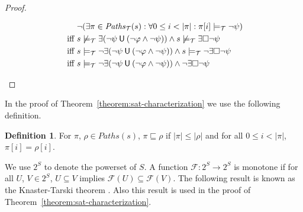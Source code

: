 \documentclass[12pt]{article}
\newcommand{\always}{\Box}
\newcommand{\until}{\mathbin{\sf U}}
\theoremstyle{definition}
\newtheorem{definition}{Definition}
\begin{document}
\begin{proof}
\begin{itemize}
\begin{align*}
& \neg (\exists \pi \in \mathit{Paths}_{\mathcal{T}}(s) : \forall 0 \leq i < |\pi| : \pi[i] \models_{\mathcal{T}} \neg \psi)\\
\mbox{ iff } & s \not\models_{\mathcal{T}} \exists (\neg \psi \until (\neg \varphi \wedge \neg \psi)) \wedge s \not\models_{\mathcal{T}} \exists \always \neg \psi\\
\mbox{ iff } & s \models_{\mathcal{T}} \neg \exists (\neg \psi \until (\neg \varphi \wedge \neg \psi)) \wedge s \models_{\mathcal{T}} \neg \exists \always \neg \psi\\
\mbox{ iff } & s \models_{\mathcal{T}} \neg \exists (\neg \psi \until (\neg \varphi \wedge \neg \psi)) \wedge \neg \exists \always \neg \psi
\end{align*}
\end{itemize}
\end{proof}

In the proof of Theorem~\ref{theorem:sat-characterization} we use the following definition.

\begin{definition}
For $\pi$, $\rho \in \mathit{Paths}(s)$, $\pi \sqsubseteq \rho$ if  $|\pi| \leq |\rho|$ and for all $0 \leq i < |\pi|$, $\pi[i] = \rho[i]$.
\end{definition}

We use $2^S$ to denote the powerset of $S$.  A function $\mathcal{F} : 2^S \to 2^S$ is monotone if for all $U$, $V \in 2^S$, $U \subseteq V$ implies $\mathcal{F}(U) \subseteq \mathcal{F}(V)$.  The following result is known as the Knaster-Tarski theorem \cite{K28,T55}.  Also this result is used in the proof of Theorem~\ref{theorem:sat-characterization}.
\end{document}
